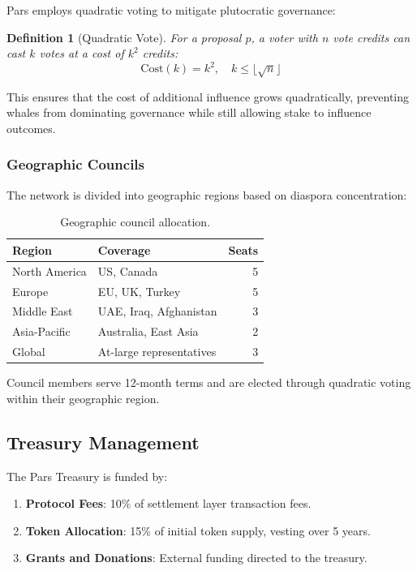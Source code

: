 \documentclass[11pt,a4paper,twocolumn]{article}
\newtheorem{definition}[theorem]{Definition}
\begin{document}
Pars employs quadratic voting \cite{lalley2018quadratic} to mitigate plutocratic governance:

\begin{definition}[Quadratic Vote]
For a proposal $p$, a voter with $n$ vote credits can cast $k$ votes at a cost of $k^2$ credits:
$$\text{Cost}(k) = k^2, \quad k \leq \lfloor\sqrt{n}\rfloor$$
\end{definition}

This ensures that the cost of additional influence grows quadratically, preventing whales from dominating governance while still allowing stake to influence outcomes.

\subsubsection{Geographic Councils}

The network is divided into geographic regions based on diaspora concentration:

\begin{table}[H]
\centering
\caption{Geographic council allocation.}
\label{tab:councils}
\begin{tabularx}{\columnwidth}{lXr}
\toprule
\textbf{Region} & \textbf{Coverage} & \textbf{Seats} \\
\midrule
North America & US, Canada & 5 \\
Europe & EU, UK, Turkey & 5 \\
Middle East & UAE, Iraq, Afghanistan & 3 \\
Asia-Pacific & Australia, East Asia & 2 \\
Global & At-large representatives & 3 \\
\bottomrule
\end{tabularx}
\end{table}

Council members serve 12-month terms and are elected through quadratic voting within their geographic region.

\subsection{Treasury Management}

The Pars Treasury is funded by:
\begin{enumerate}[leftmargin=*]
  \item \textbf{Protocol Fees}: 10\% of settlement layer transaction fees.
  \item \textbf{Token Allocation}: 15\% of initial token supply, vesting over 5 years.
  \item \textbf{Grants and Donations}: External funding directed to the treasury.
\end{enumerate}
\end{document}
